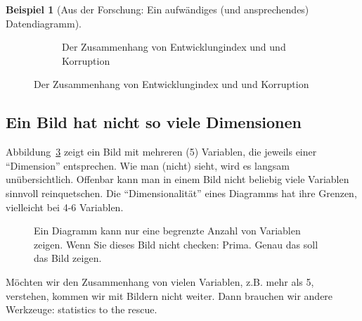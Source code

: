 \documentclass[
  a4paper,
]{scrbook}
\theoremstyle{definition}
\newtheorem{example}{Beispiel}[chapter]
\theoremstyle{definition}
\theoremstyle{definition}
\theoremstyle{remark}
\begin{document}
\begin{example}[Aus der Forschung: Ein aufwändiges (und ansprechendes)
Datendiagramm]
\begin{figure}
\begin{minipage}{0.48\linewidth}
\begin{figure}[H]
{}

\caption{\label{fig-develop-corrupt}Der Zusammenhang von
Entwicklungindex und und Korruption}

\end{figure}%

\end{minipage}%

\end{figure}%

\subsection{Ein Bild hat nicht so viele
Dimensionen}\label{ein-bild-hat-nicht-so-viele-dimensionen}

Abbildung~\ref{fig-many-dims} zeigt ein Bild mit mehreren (5) Variablen,
die jeweils einer ``Dimension'' entsprechen. Wie man (nicht) sieht, wird
es langsam unübersichtlich. Offenbar kann man in einem Bild nicht
beliebig viele Variablen sinnvoll reinquetschen. Die ``Dimensionalität''
eines Diagramms hat ihre Grenzen, vielleicht bei 4-6 Variablen.

\begin{figure}


\caption{\label{fig-many-dims}Ein Diagramm kann nur eine begrenzte
Anzahl von Variablen zeigen. Wenn Sie dieses Bild nicht checken: Prima.
Genau das soll das Bild zeigen.}

\end{figure}%

Möchten wir den Zusammenhang von vielen Variablen, z.B. mehr als 5,
verstehen, kommen wir mit Bildern nicht weiter. Dann brauchen wir andere
Werkzeuge: statistics to the rescue.


\end{example}
\end{document}
